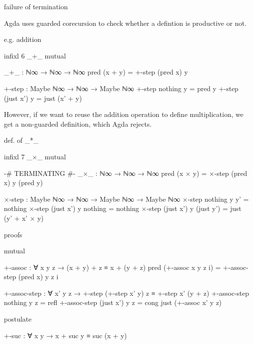 failure of termination

Agda uses guarded corecursion to check whether a defintion is productive or not.

e.g. addition

\begin{code}[hide]
infixl 6 _+_
mutual
\end{code}
\begin{code}
  _+_ : ℕ∞ → ℕ∞ → ℕ∞
  pred (x + y) = +-step (pred x) y

  +-step : Maybe ℕ∞ → ℕ∞ → Maybe ℕ∞
  +-step nothing    y = pred y
  +-step (just x')  y = just (x' + y)
\end{code}

However, if we want to reuse the addition operation to define multiplication, we get a non-guarded definition, which Agda rejects.

def. of \_*\_

\begin{code}[hide]
infixl 7 _×_
mutual
\end{code}
\begin{code}
  {-# TERMINATING #-}
  _×_ : ℕ∞ → ℕ∞ → ℕ∞
  pred (x × y) = ×-step (pred x) y (pred y)

  ×-step :
    Maybe ℕ∞ → ℕ∞ → Maybe ℕ∞ → Maybe ℕ∞
  ×-step nothing    y y'         = nothing
  ×-step (just x')  y nothing    = nothing
  ×-step (just x')  y (just y')  = just (y' + x' × y)
\end{code}

proofs

\begin{code}[hide]
mutual
\end{code}
\begin{code}
  +-assoc : ∀ x y z → (x + y) + z ≡ x + (y + z)
  pred (+-assoc x y z i) = +-assoc-step (pred x) y z i

  +-assoc-step :
    ∀ x' y z →
    +-step (+-step x' y) z ≡ +-step x' (y + z)
  +-assoc-step nothing    y z = refl
  +-assoc-step (just x')  y z = cong just (+-assoc x' y z)
\end{code}

\begin{code}[hide]
postulate
\end{code}
\begin{code}
  +-suc : ∀ x y → x + suc y ≡ suc (x + y)
\end{code}

